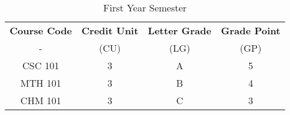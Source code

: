 \documentclass{article}
\begin{document}
\begin{table}[h!]
	\begin{center}
		\caption{First Year Semester}
		\label{tab:table}
		\begin{tabular}{c|c|c|c}
			\textbf{Course Code} & \textbf{Credit Unit} &
			\textbf{Letter Grade} & \textbf{Grade Point}\\ - & (CU) & (LG) & (GP) \\
			\hline
			CSC 101 & 3 & A & 5\\
			MTH 101 & 3 & B & 4\\
			CHM 101 & 3 & C & 3\\
		\end{tabular}
	\end{center}
\end{table}
\end{document}
